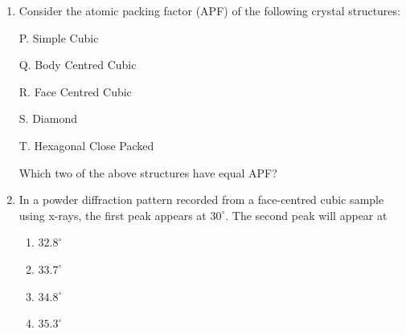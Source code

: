 \documentclass[journal,13pt,onecolumn]{IEEEtran}
\begin{document}
\begin{enumerate}[itemsep = 1em]
\hfill{}
\begin{enumerate}
\end{enumerate}

\item Consider the atomic packing factor (APF) of the following crystal structures:

P. Simple Cubic

Q. Body Centred Cubic

R. Face Centred Cubic

S. Diamond

T. Hexagonal Close Packed

Which two of the above structures have equal APF?

\hfill{}
\begin{enumerate}
\end{enumerate}

\item In a powder diffraction pattern recorded from a face-centred cubic sample using x-rays, the first peak appears at $30^\circ$. The second peak will appear at

\hfill{}
\begin{multicols}{4}
\begin{enumerate}

\item $32.8^\circ$
\item $33.7^\circ$
\item $34.8^\circ$
\item $35.3^\circ$

\end{enumerate}
\end{multicols}


\vspace{8em}


\end{enumerate}
\end{document}
